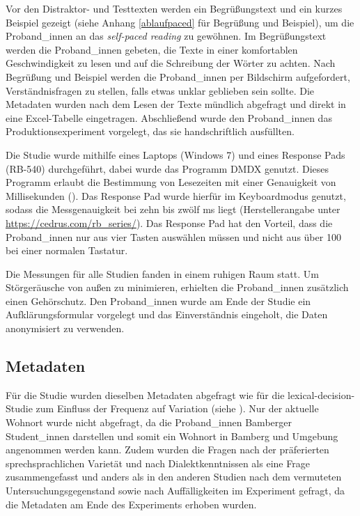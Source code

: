 Vor den Distraktor- und Testtexten werden ein Begrüßungstext und ein kurzes Beispiel gezeigt (siehe Anhang \ref{ablaufpaced} für Begrüßung und Beispiel), um die Pro\-\mbox{band\_in}\-nen an das \textit{self-paced reading} zu gewöhnen. Im Begrüßungstext werden die Proband\_innen gebeten, die Texte in einer komfortablen Geschwindigkeit zu lesen und auf die Schreibung der Wörter zu achten. Nach Begrüßung und Beispiel werden die Proband\_innen per Bildschirm aufgefordert, Verständnisfragen zu stellen, falls etwas unklar geblieben sein sollte. Die Metadaten wurden nach dem Lesen der Texte mündlich abgefragt und direkt in eine Excel-Tabelle eingetragen. Abschließend wurde den Proband\_innen das Produktionsexperiment vorgelegt, das sie handschriftlich ausfüllten.


Die Studie wurde mithilfe eines Laptops (Windows 7) und eines Response Pads (RB-540) durchgeführt, dabei wurde das Programm DMDX genutzt. Dieses Programm erlaubt die Bestimmung von Lesezeiten mit einer Genauigkeit von Millisekunden (\cite{Forster.2003}). Das Response Pad wurde hierfür im Keyboardmodus genutzt, sodass die Messgenauigkeit bei zehn bis zwölf ms liegt (Herstellerangabe unter \url{https://cedrus.com/rb\_series/}). Das Response Pad hat den Vorteil, dass die Proband\_innen nur aus vier Tasten auswählen müssen und nicht aus über 100 bei einer normalen Tastatur. 


Die Messungen für alle Studien fanden in einem ruhigen Raum statt. Um Störgeräusche von außen zu minimieren, erhielten die Proband\_innen zusätzlich einen Gehörschutz. Den Proband\_innen wurde am Ende der Studie ein Aufklärungsformular vorgelegt und das Einverständnis eingeholt, die Daten anonymisiert zu verwenden.

\subsection{Metadaten}
\label{metadaten}

Für die Studie wurden dieselben Metadaten abgefragt wie für die lexical-decision-Studie zum Einfluss der Frequenz auf Variation (siehe ). Nur der aktuelle Wohnort wurde nicht abgefragt, da die Proband\_innen Bamberger Student\_innen darstellen und somit ein Wohnort in Bamberg und Umgebung angenommen werden kann. Zudem wurden die Fragen nach der präferierten sprechsprachlichen Varietät und nach Dialektkenntnissen als eine Frage zusammengefasst und anders als in den anderen Studien nach dem vermuteten Untersuchungsgegenstand sowie nach Auffälligkeiten im Experiment gefragt, da die Metadaten am Ende des Experiments erhoben wurden. 


